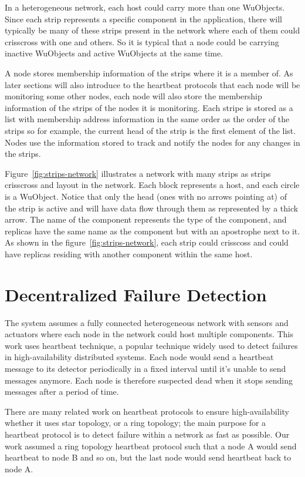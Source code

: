 In a heterogeneous network, each host could carry more than one WuObjects.
Since each strip represents a specific component in the application, there will
typically be many of these strips present in the network where each of them
could crisscross with one and others. So it is typical that a node could be
carrying inactive WuObjects and active WuObjects at the same time.

A node stores membership information of the strips where it is a member of. As
later sections will also introduce to the heartbeat protocols that each node will
be monitoring some other nodes, each node will also store the membership
information of the strips of the nodes it is monitoring. Each stripe is stored
as a list with membership address information in the same order as the order of the
strips so for example, the current head of the strip is the first element of
the list. Nodes use the information stored to track and notify the nodes for
any changes in the strips.

Figure~\ref{fig:strips-network} illustrates a network with many strips as
strips crisscross and layout in the network. Each block represents a host, and
each circle is a WuObject. Notice that only the head (ones with no arrows
pointing at) of the strip is active and will have data flow through them as
represented by a thick arrow. The name of the component represents the type of
the component, and replicas have the same name as the component but with an
apostrophe next to it. As shown in the figure~\ref{fig:strips-network}, each
strip could crisscoss and could have replicas residing with another component
within the same host.

\section{Decentralized Failure Detection}
\label{s:dfd}

The system assumes a fully connected heterogeneous network with sensors and
actuators where each node in the network could host multiple components. This
work uses heartbeat technique, a popular technique widely used to detect
failures in high-availability distributed systems. Each node would send
a heartbeat message to its detector periodically in a fixed interval
until it's unable to send messages anymore. Each node is therefore suspected
dead when it stops sending messages after a period of time.

There are many related work on heartbeat protocols to ensure high-availability
whether it uses star topology, or a ring topology; the main purpose for
a heartbeat protocol is to detect failure within a network as fast as possible.
Our work assumed a ring topology heartbeat protocol such that a node A would
send heartbeat to node B and so on, but the last node would send heartbeat back
to node A.

